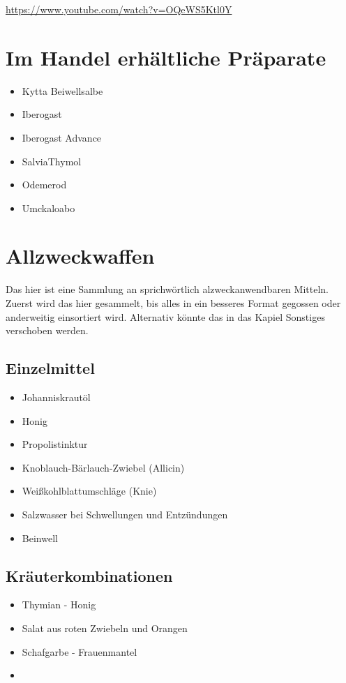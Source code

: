  

\cite{swrhandwerkskunst}  

\url{https://www.youtube.com/watch?v=OQeWS5Ktl0Y}




\newpage





\section{Im Handel erhältliche Präparate}


\begin{itemize}
	\item Kytta Beiwellsalbe
	\item Iberogast
	\item Iberogast Advance
	\item SalviaThymol
	\item Odemerod
	\item Umckaloabo
\end{itemize}


\newpage


\section{Allzweckwaffen}

Das hier ist eine Sammlung an sprichwörtlich alzweckanwendbaren Mitteln. Zuerst wird das hier gesammelt, bis alles in ein besseres Format gegossen oder anderweitig einsortiert wird. Alternativ könnte das in das Kapiel Sonstiges verschoben werden.

\subsection{Einzelmittel}
\begin{itemize}
	\item Johanniskrautöl
	\item Honig
	\item Propolistinktur
	\item Knoblauch-Bärlauch-Zwiebel (Allicin)
	\item Weißkohlblattumschläge (Knie)
	\item Salzwasser bei Schwellungen und Entzündungen
	\item Beinwell
\end{itemize}


\subsection{Kräuterkombinationen}
\begin{itemize}
	\item Thymian - Honig
	\item Salat aus roten Zwiebeln und Orangen
	\item Schafgarbe - Frauenmantel
	\item 
\end{itemize}





